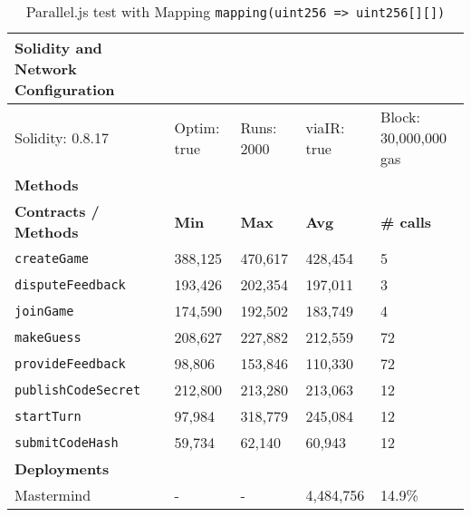 \begin{table}[ht]
\centering
\begin{tabular}{|l|l|l|l|l|}
\hline
\textbf{Solidity and Network Configuration} & \multicolumn{4}{l|}{} \\ \hline
Solidity: 0.8.17 & Optim: true & Runs: 2000 & viaIR: true & Block: 30,000,000 gas \\ \hline
\textbf{Methods} & \multicolumn{4}{l|}{} \\ \hline
\textbf{Contracts / Methods} & \textbf{Min} & \textbf{Max} & \textbf{Avg} & \textbf{\# calls} \\ \hline

\texttt{createGame} & 388,125 & 470,617 & 428,454 & 5 \\ \hline
\texttt{disputeFeedback} & 193,426 & 202,354 & 197,011 & 3 \\ \hline
\texttt{joinGame} & 174,590 & 192,502 & 183,749 & 4 \\ \hline
\texttt{makeGuess} & 208,627 & 227,882 & 212,559 & 72 \\ \hline
\texttt{provideFeedback} & 98,806 & 153,846 & 110,330 & 72 \\ \hline
\texttt{publishCodeSecret} & 212,800 & 213,280 & 213,063 & 12 \\ \hline
\texttt{startTurn} & 97,984 & 318,779 & 245,084 & 12 \\ \hline
\texttt{submitCodeHash} & 59,734 & 62,140 & 60,943 & 12 \\ \hline
\textbf{Deployments} & \multicolumn{4}{l|}{} \\ \hline
Mastermind & - & - & 4,484,756 & 14.9\% \\ \hline
\end{tabular}
\caption{Parallel.js test with Mapping \lstinline{mapping(uint256 => uint256[][])}}
\label{tab:parallel-2-mapping}
\end{table}

